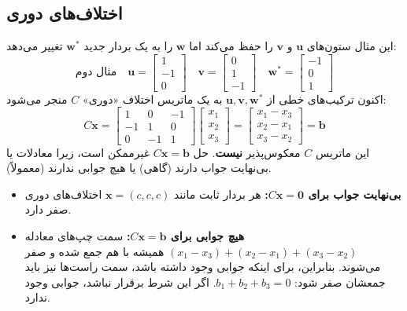 \documentclass[12pt, a4paper]{book}
\begin{document}
	\subsection*{اختلاف‌های دوری}
	این مثال ستون‌های $\mathbf{u}$ و $\mathbf{v}$ را حفظ می‌کند اما $\mathbf{w}$ را به یک بردار جدید $\mathbf{w}^*$ تغییر می‌دهد:
	\[ \text{مثال دوم} \quad \mathbf{u} = \begin{bmatrix} 1 \\ -1 \\ 0 \end{bmatrix} \quad \mathbf{v} = \begin{bmatrix} 0 \\ 1 \\ -1 \end{bmatrix} \quad \mathbf{w}^* = \begin{bmatrix} -1 \\ 0 \\ 1 \end{bmatrix} \]
	اکنون ترکیب‌های خطی از $\mathbf{u}, \mathbf{v}, \mathbf{w}^*$ به یک ماتریس اختلاف «دوری» $C$ منجر می‌شود:
	\begin{equation}
		C\mathbf{x} = \begin{bmatrix} 1 & 0 & -1 \\ -1 & 1 & 0 \\ 0 & -1 & 1 \end{bmatrix} \begin{bmatrix} x_1 \\ x_2 \\ x_3 \end{bmatrix} = \begin{bmatrix} x_1 - x_3 \\ x_2 - x_1 \\ x_3 - x_2 \end{bmatrix} = \mathbf{b}
	\end{equation}
	این ماتریس $C$ معکوس‌پذیر \textbf{نیست}. حل $C\mathbf{x}=\mathbf{b}$ غیرممکن است، زیرا معادلات یا بی‌نهایت جواب دارند (گاهی) یا هیچ جوابی ندارند (معمولاً).
	\begin{itemize}
		\item \textbf{بی‌نهایت جواب برای $C\mathbf{x}=\mathbf{0}$:} هر بردار ثابت مانند $\mathbf{x}=(c,c,c)$ اختلاف‌های دوری صفر دارد.
		\item \textbf{هیچ جوابی برای $C\mathbf{x}=\mathbf{b}$:} سمت چپ‌های معادله $(x_1-x_3)+(x_2-x_1)+(x_3-x_2)$ همیشه با هم جمع شده و صفر می‌شوند. بنابراین، برای اینکه جوابی وجود داشته باشد، سمت راست‌ها نیز باید جمعشان صفر شود: $b_1+b_2+b_3=0$. اگر این شرط برقرار نباشد، جوابی وجود ندارد.
	\end{itemize}
	
\end{document}
